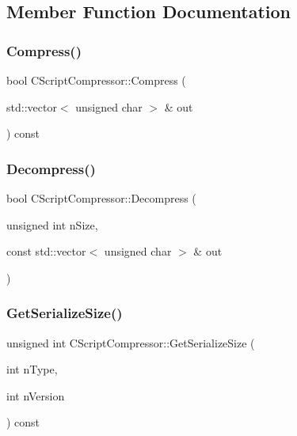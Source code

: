 \subsection{Member Function Documentation}
\mbox{\label{class_c_script_compressor_a563ba251e7720841b4d5fc30ebd736e6}} 
\subsubsection{\texorpdfstring{Compress()}{Compress()}}
{\footnotesize\ttfamily bool C\+Script\+Compressor\+::\+Compress (\begin{DoxyParamCaption}\item[{std\+::vector$<$ unsigned char $>$ \&}]{out }\end{DoxyParamCaption}) const\hspace{0.3cm}{\ttfamily [protected]}}

\mbox{\label{class_c_script_compressor_a1feb663ddab3a45218c7cb02f2a25717}} 
\subsubsection{\texorpdfstring{Decompress()}{Decompress()}}
{\footnotesize\ttfamily bool C\+Script\+Compressor\+::\+Decompress (\begin{DoxyParamCaption}\item[{unsigned int}]{n\+Size,  }\item[{const std\+::vector$<$ unsigned char $>$ \&}]{out }\end{DoxyParamCaption})\hspace{0.3cm}{\ttfamily [protected]}}

\mbox{\label{class_c_script_compressor_afd6f2bea6c0ba2d34f770997e96bc23d}} 
\subsubsection{\texorpdfstring{Get\+Serialize\+Size()}{GetSerializeSize()}}
{\footnotesize\ttfamily unsigned int C\+Script\+Compressor\+::\+Get\+Serialize\+Size (\begin{DoxyParamCaption}\item[{int}]{n\+Type,  }\item[{int}]{n\+Version }\end{DoxyParamCaption}) const\hspace{0.3cm}{\ttfamily [inline]}}

